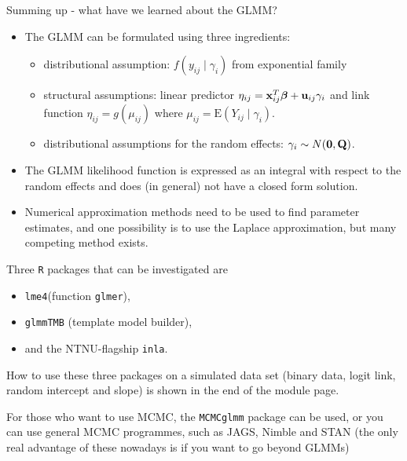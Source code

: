 \documentclass[
  ignorenonframetext,
]{beamer}
\providecommand{\tightlist}{%
  \setlength{\itemsep}{0pt}\setlength{\parskip}{0pt}}
\begin{document}
\begin{frame}{Summing up - what have we learned about the GLMM?}
\protect{}\label{summing-up---what-have-we-learned-about-the-glmm}
\begin{itemize}
\tightlist
\item
  The GLMM can be formulated using three ingredients:

  \begin{itemize}
  \tightlist
  \item
    distributional assumption: \(f(y_{ij}\mid \gamma_i)\) from
    exponential family
  \item
    structural assumptions: linear predictor
    \(\eta_{ij}={\bf x}_{ij}^T {\boldsymbol \beta}+{\bf u}_{ij}\gamma_i\)
    and link function \(\eta_{ij}=g(\mu_{ij})\) where
    \(\mu_{ij}=\text{E}(Y_{ij}\mid \gamma_i)\).
  \item
    distributional assumptions for the random effects:
    \(\gamma_i\sim N({\bf 0},{\bf Q})\).
  \end{itemize}
\item
  The GLMM likelihood function is expressed as an integral with respect
  to the random effects and does (in general) not have a closed form
  solution.
\item
  Numerical approximation methods need to be used to find parameter
  estimates, and one possibility is to use the Laplace approximation,
  but many competing method exists.
\end{itemize}
\end{frame}

\begin{frame}[fragile]
Three \texttt{R} packages that can be investigated are

\begin{itemize}
\tightlist
\item
  \texttt{lme4}(function \texttt{glmer}),
\item
  \texttt{glmmTMB} (template model builder),
\item
  and the NTNU-flagship \texttt{inla}.
\end{itemize}

How to use these three packages on a simulated data set (binary data,
logit link, random intercept and slope) is shown in the end of the
module page.

For those who want to use MCMC, the \texttt{MCMCglmm} package can be
used, or you can use general MCMC programmes, such as JAGS, Nimble and
STAN (the only real advantage of these nowadays is if you want to go
beyond GLMMs)
\end{frame}
\end{document}
